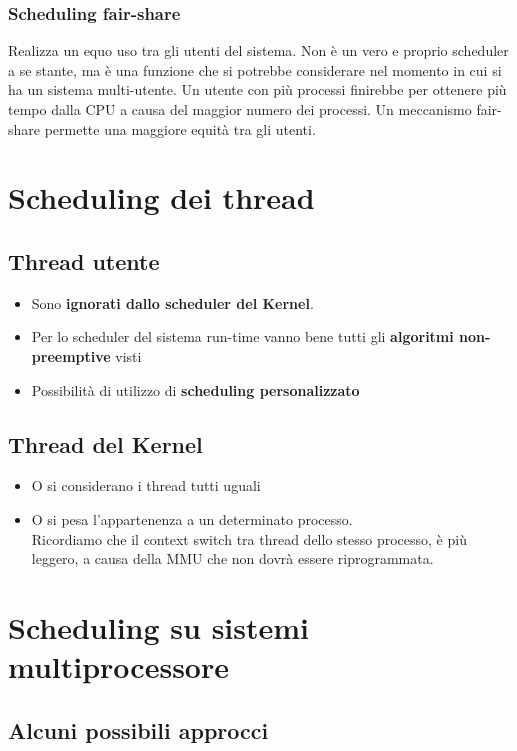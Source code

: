 \documentclass{report}
\begin{document}
\subsubsection{Scheduling fair-share}
Realizza un equo uso tra gli utenti del sistema. Non è un vero e proprio scheduler a se stante, ma è una funzione che si potrebbe considerare nel momento in cui si ha un sistema multi-utente. Un utente con più processi finirebbe per ottenere più tempo dalla CPU a causa del maggior numero dei processi. Un meccanismo fair-share permette una maggiore equità tra gli utenti.

\section{Scheduling dei thread}
\subsection{Thread utente}
\begin{itemize}
    \item Sono \textbf{ignorati dallo scheduler del Kernel}.
    \item Per lo scheduler del sistema run-time vanno bene tutti gli \textbf{algoritmi non-preemptive} visti
    \item Possibilità di utilizzo di \textbf{scheduling personalizzato}
\end{itemize}

\subsection{Thread del Kernel}
\begin{itemize}
    \item O si considerano i thread tutti uguali
    \item O si pesa l'appartenenza a un determinato processo.\\
    Ricordiamo che il context switch tra thread dello stesso processo, è più leggero, a causa della MMU che non dovrà essere riprogrammata.
\end{itemize}

\newpage

\section{Scheduling su sistemi multiprocessore}

\subsection{Alcuni possibili approcci}
\end{document}
